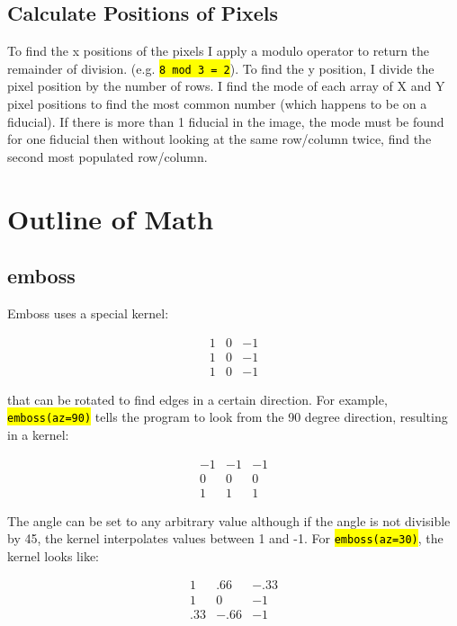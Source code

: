 \documentclass[10pt]{scrartcl}
\begin{document}
    \subsection{Calculate Positions of Pixels} %
    \label{sub:calculate_positions_of_pixels}
    To find the x positions of the pixels I apply a modulo operator to return the remainder of division. (e.g. \hl{\texttt{8 mod 3 = 2}}). To find the y position, I divide the pixel position by the number of rows. I find the mode of each array of X and Y pixel positions to find the most common number (which happens to be on a fiducial). If there is more than 1 fiducial in the image, the mode must be found for one fiducial then without looking at the same row/column twice, find the second most populated row/column.


\section{Outline of Math}
    \subsection{emboss} %
    \label{sub:emboss}
    Emboss uses a special kernel:

    \[ \begin{array}{ccc}
    1 &  0 & -1 \\
    1 &  0 & -1 \\
    1 &  0 & -1 \end{array}\] 

     that can be rotated to find edges in a certain direction. For example, \hl{\texttt{emboss(az=90)}} tells the program to look from the 90 degree direction, resulting in a kernel:

     \[ \begin{array}{ccc}
    -1 & -1 & -1 \\
     0 &  0 &  0 \\
     1 &  1 &  1 \end{array}\] 

     The angle can be set to any arbitrary value although if the angle is not divisible by 45, the kernel interpolates values between 1 and -1. For \hl{\texttt{emboss(az=30)}}, the kernel looks like:

     \[ \begin{array}{ccc}
    1   & .66   & -.33 \\
    1   &  0    & -1 \\
     .33&  -.66 & -1 \end{array}\] 
\end{document}
